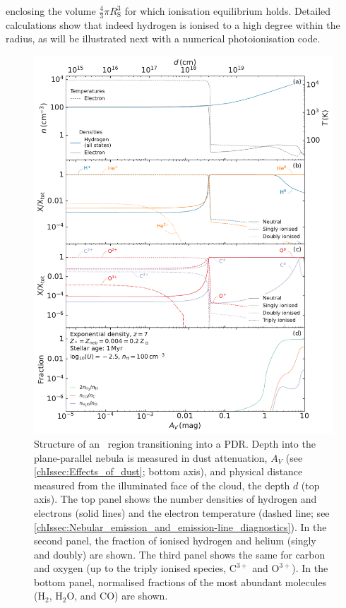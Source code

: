 \noindent enclosing the volume $\frac{4}{3} \pi R_\text{S}^3$ for which ionisation equilibrium holds. Detailed calculations show that indeed hydrogen is ionised to a high degree within the \citeauthor{1939ApJ....89..526S} radius, as will be illustrated next with a numerical photoionisation code.
\begin{figure}
    \centering
    \includegraphics[width=0.95\linewidth]{"Figs/Cloudy_PDR_structure"}
    \caption[Structure of an \HII\ region transitioning into a PDR.]{Structure of an \HII\ region transitioning into a PDR. Depth into the plane-parallel nebula is measured in dust attenuation, $A_V$ (see \cref{chIssec:Effects_of_dust}; bottom axis), and physical distance measured from the illuminated face of the cloud, the depth $d$ (top axis). The top panel shows the number densities of hydrogen and electrons (solid lines) and the electron temperature (dashed line; see \cref{chIssec:Nebular_emission_and_emission-line_diagnostics}). In the second panel, the fraction of ionised hydrogen and helium (singly and doubly) are shown. The third panel shows the same for carbon and oxygen (up to the triply ionised species, $\mathrm{C^{3+}}$ and $\mathrm{O^{3+}}$). In the bottom panel, normalised fractions of the most abundant molecules ($\mathrm{H_2}$, $\mathrm{H_2 O}$, and $\mathrm{CO}$) are shown.}
    \label{chIfig:Cloudy_PDR_structure}
\end{figure}


